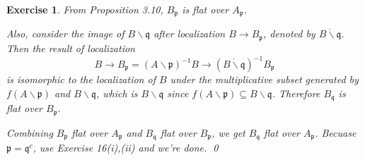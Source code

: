 \documentclass{article}
\theoremstyle{breakstyle}
\newtheorem{exercise}{Exercise}
\begin{document}
\begin{exercise}
    From \emph{Proposition 3.10}, $B_{\mathfrak{p}}$ is flat over $A_{\mathfrak{p}}$.

    Also, consider the image of $B\backslash \mathfrak{q}$ after localization $B\longrightarrow B_{\mathfrak{p}}$, denoted by $\overline{B\backslash \mathfrak{q}}$.
    Then the result of localization
    $$
    B\longrightarrow B_{\mathfrak{p}}=(A\backslash \mathfrak{p})^{-1}B\longrightarrow (\overline{B\backslash \mathfrak{q}})^{-1}B_{\mathfrak{p}}
    $$
    is isomorphic to the localization of $B$ under the multiplicative subset generated by $f(A\backslash \mathfrak{p})$ and $B\backslash \mathfrak{q}$,
    which is $B\backslash \mathfrak{q}$ since $f(A\backslash \mathfrak{p})\subseteq B\backslash \mathfrak{q}$.
    Therefore $B_{\mathfrak{q}}$ is flat over $B_{\mathfrak{p}}$.

    Combining $B_{\mathfrak{p}}$ flat over $A_{\mathfrak{p}}$ and $B_{\mathfrak{q}}$ flat over $B_{\mathfrak{p}}$,
    we get $B_{\mathfrak{q}}$ flat over $A_{\mathfrak{p}}$.
    Becuase $\mathfrak{p}=\mathfrak{q}^{c}$, use \emph{Exercise 16(i),(ii)} and we're done.
    \qed
\end{exercise}
\end{document}
